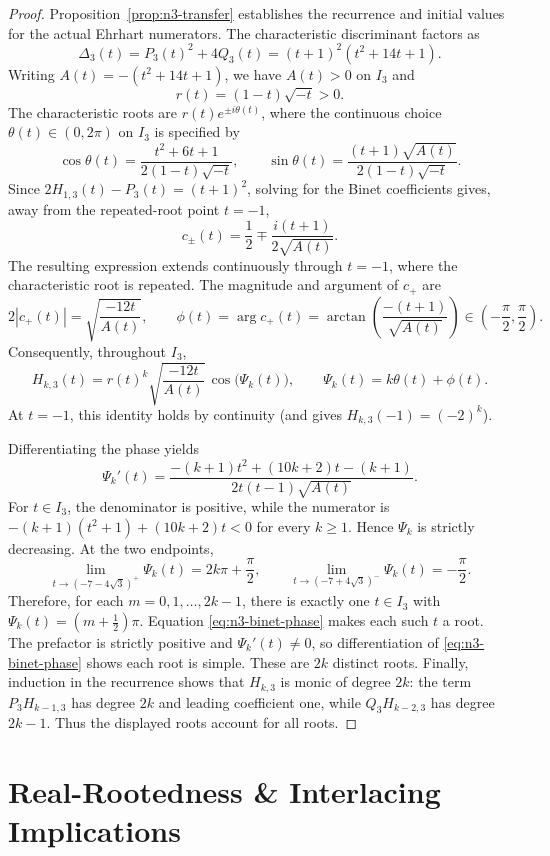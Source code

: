 \documentclass[11pt,a4paper]{article}
\theoremstyle{definition}
\begin{document}
\begin{proof}
Proposition~\ref{prop:n3-transfer} establishes the recurrence and initial
values for the actual Ehrhart numerators. The characteristic
discriminant factors as
\[
\Delta_3(t)=P_3(t)^2+4Q_3(t)
=(t+1)^2(t^2+14t+1).
\]
Writing $A(t)=-(t^2+14t+1)$, we have $A(t)>0$ on $I_3$ and
\[
r(t)=(1-t)\sqrt{-t}>0.
\]
The characteristic roots are $r(t)e^{\pm i\theta(t)}$, where the
continuous choice $\theta(t)\in(0,2\pi)$ on $I_3$ is specified by
\[
\cos\theta(t)=\frac{t^2+6t+1}{2(1-t)\sqrt{-t}},\qquad
\sin\theta(t)=\frac{(t+1)\sqrt{A(t)}}{2(1-t)\sqrt{-t}}.
\]
Since $2H_{1,3}(t)-P_3(t)=(t+1)^2$, solving for the Binet coefficients
gives, away from the repeated-root point $t=-1$,
\[
c_\pm(t)=\frac12\mp\frac{i(t+1)}{2\sqrt{A(t)}}.
\]
The resulting expression extends continuously through $t=-1$, where
the characteristic root is repeated. The magnitude and argument of
$c_+$ are
\[
2|c_+(t)|=\sqrt{\frac{-12t}{A(t)}},\qquad
\phi(t)=\arg c_+(t)
=\arctan\!\left(\frac{-(t+1)}{\sqrt{A(t)}}\right)
\in\left(-\frac\pi2,\frac\pi2\right).
\]
Consequently, throughout $I_3$,
\begin{equation}\label{eq:n3-binet-phase}
H_{k,3}(t)=r(t)^k
\sqrt{\frac{-12t}{A(t)}}\,
\cos\bigl(\Psi_k(t)\bigr),
\qquad \Psi_k(t)=k\theta(t)+\phi(t).
\end{equation}
At $t=-1$, this identity holds by continuity (and gives
$H_{k,3}(-1)=(-2)^k$).

Differentiating the phase yields
\[
\Psi_k'(t)=
\frac{-(k+1)t^2+(10k+2)t-(k+1)}
{2t(t-1)\sqrt{A(t)}}.
\]
For $t\in I_3$, the denominator is positive, while the numerator is
$-(k+1)(t^2+1)+(10k+2)t<0$ for every $k\ge1$. Hence $\Psi_k$ is
strictly decreasing. At the two endpoints,
\[
\lim_{t\to(-7-4\sqrt3)^+}\Psi_k(t)
=2k\pi+\frac\pi2,\qquad
\lim_{t\to(-7+4\sqrt3)^-}\Psi_k(t)=-\frac\pi2.
\]
Therefore, for each $m=0,1,\ldots,2k-1$, there is exactly one
$t\in I_3$ with $\Psi_k(t)=(m+\tfrac12)\pi$. Equation
\eqref{eq:n3-binet-phase} makes each such $t$ a root. The prefactor is
strictly positive and $\Psi_k'(t)\ne0$, so differentiation of
\eqref{eq:n3-binet-phase} shows each root is simple. These are $2k$
distinct roots. Finally, induction in the recurrence shows that
$H_{k,3}$ is monic of degree $2k$: the term $P_3H_{k-1,3}$ has degree
$2k$ and leading coefficient one, while $Q_3H_{k-2,3}$ has degree
$2k-1$. Thus the displayed roots account for all roots.
\end{proof}

\section{Real-Rootedness \& Interlacing Implications}
\label{sec:root-implications}
\end{document}
